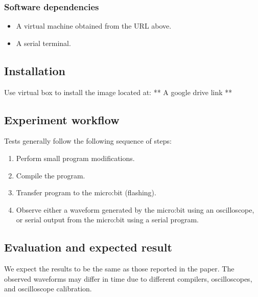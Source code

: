 {\subsubsection{Software dependencies}

\begin{itemize}
    \item A virtual machine obtained from the URL above.
    \item A serial terminal.

\end{itemize}

\subsection{Installation}

Use virtual box to install the image located at: ** A google drive link **

\subsection{Experiment workflow}

Tests generally follow the following sequence of steps:

\begin{enumerate}
    \item Perform small program modifications.
    \item Compile the program.
    \item Transfer program to the micro:bit (flashing).
    \item Observe either a waveform generated by the micro:bit using an oscilloscope, or serial output from the micro:bit using a serial program.
\end{enumerate}

\subsection{Evaluation and expected result}

We expect the results to be the same as those reported in the paper. The observed waveforms may differ in time due to different compilers, oscilloscopes, and oscilloscope calibration.

}
